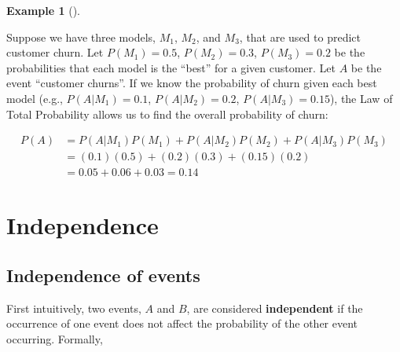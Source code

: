 \documentclass[
  letterpaper,
  DIV=11,
  numbers=noendperiod]{scrreport}
\theoremstyle{definition}
\newtheorem{example}{Example}[chapter]
\theoremstyle{plain}
\theoremstyle{plain}
\theoremstyle{definition}
\theoremstyle{remark}
\begin{document}
\begin{tcolorbox}[enhanced jigsaw, opacitybacktitle=0.6, bottomtitle=1mm, opacityback=0, toprule=.15mm, colbacktitle=quarto-callout-note-color!10!white, colback=white, left=2mm, title={Customer churn}, breakable, rightrule=.15mm, leftrule=.75mm, titlerule=0mm, colframe=quarto-callout-note-color-frame, arc=.35mm, coltitle=black, toptitle=1mm, bottomrule=.15mm]

\begin{example}[]\protect\hypertarget{exm-total-probability-data-science}{}\label{exm-total-probability-data-science}

Suppose we have three models, \(M_1\), \(M_2\), and \(M_3\), that are
used to predict customer churn. Let \(P(M_1)=0.5\), \(P(M_2)=0.3\),
\(P(M_3)=0.2\) be the probabilities that each model is the ``best'' for
a given customer. Let \(A\) be the event ``customer churns''. If we know
the probability of churn given each best model (e.g., \(P(A|M_1)=0.1\),
\(P(A|M_2)=0.2\), \(P(A|M_3)=0.15\)), the Law of Total Probability
allows us to find the overall probability of churn:

\[
\begin{aligned}
P(A) &= P(A|M_1)P(M_1) + P(A|M_2)P(M_2) + P(A|M_3)P(M_3) \\
&= (0.1)(0.5) + (0.2)(0.3) + (0.15)(0.2)\\
& = 0.05 + 0.06 + 0.03 = 0.14
\end{aligned}
\]

\end{example}

\end{tcolorbox}

\section{Independence}\label{independence}

\subsection{Independence of events}\label{independence-of-events}

First intuitively, two events, \(A\) and \(B\), are considered
\textbf{independent} if the occurrence of one event does not affect the
probability of the other event occurring. Formally,
\end{document}
